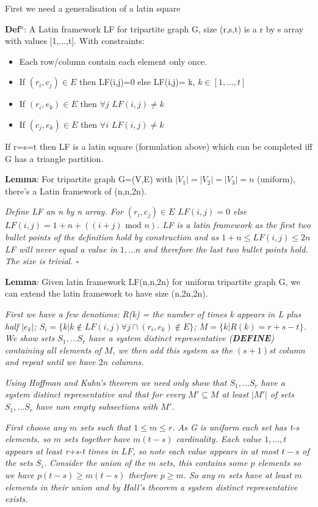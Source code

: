 \documentclass[a4paper,11pt]{report}
\newcounter{row}
\newcounter{col}
\begin{document}
First we need a generalisation of a latin square

\textbf{Def$^n$}: A Latin framework LF for tripartite graph G, size (r,s,t) is a r by s array with values [1,...,t]. With constraints:
\begin{itemize}
\item{Each row/column contain each element only once.}
\item{If $(r_i,c_j)\in E$ then LF(i,j)=0 else LF(i,j)= k, $k\in [1,...,t]$}
\item{If $(r_i,e_k)\in E$  then $\forall j$ $LF(i,j)\neq k$}
\item{If $(c_j,e_k)\in E$  then $\forall i$ $LF(i,j)\neq k$}
\end{itemize}
If r=s=t then LF is a latin square (formulation above) which can be completed iff G has a triangle partition.

\textbf{Lemma}: For tripartite graph G=(V,E) with $|V_1|=|V_2|=|V_3|=n$ (uniform), there's a Latin framework of (n,n,2n).

\textit{Define LF an n by n array. For $(r_i,c_j)\in E$ $LF(i,j)=0$ else $LF(i,j)=1+n+((i+j)\text{ mod }n)$. LF is a latin framework as the first two bullet points of the definition hold by construction and as $1+n\leq LF(i,j)\leq 2n$ LF will never equal a value in $1,...n$ and therefore the last two bullet points hold. The size is trivial. $\square$}

\textbf{Lemma}: Given latin framework LF(n,n,2n) for uniform tripartite graph G, we can extend the latin framework to have size
(n,2n,2n).

\textit{First we have a few denotions: R(k) = the number of times k appears in L plus half $|e_k|$; $S_i=\{k|k \not\in LF(i,j) \forall j \cap (r_i,e_k)\not\in E\}$; $M=\{k|R(k)=r+s-t\}$. We show sets $S_1,...S_r$ have a system distinct representative (\textbf{DEFINE}) containing all elements of $M$, we then add this system as the $(s+1)$st column and repeat until we have $2n$ columns.}

\textit{Using Hoffman and Kuhn's theorem \cite{hoffman} we need only show that $S_1,...S_r$ have a system distinct representative and that for every $M'\subseteq M$ at least $|M'|$ of sets $S_1,...S_r$ have non empty subsections with $M'$.}

\textit{First choose any $m$ sets such that $1\leq m \leq r$. As G is uniform each set has t-s elements, so $m$ sets together have $m(t-s)$ cardinality. Each value $1,...,t$ appears at least r+s-t times in $LF$, so note each value appears in at most $t-s$ of the sets $S_i$. Consider the union of the $m$ sets, this contains some $p$ elements so we have $p(t-s)\geq m(t-s)$ therfore $p\geq m$. So any $m$ sets have at least $m$ elements in their union and by Hall's theorem \cite{hall} a system distinct representative exists.}
\end{document}

